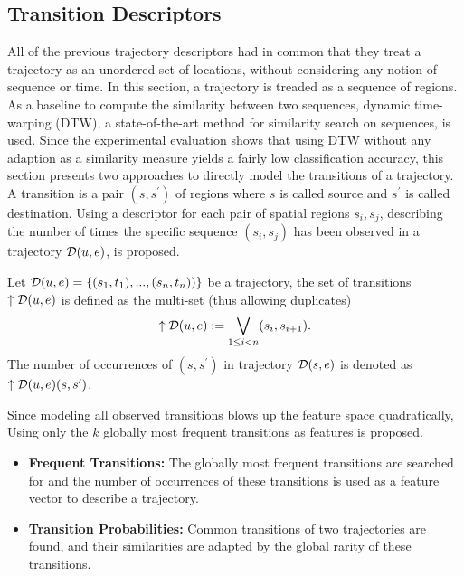 \subsection{Transition Descriptors}\label{subsubsec:trans}
All of the previous trajectory descriptors had in common that they treat a trajectory as an unordered set of locations, without considering any notion of sequence or time. In this section, a trajectory is treaded as a sequence of regions. As a baseline to compute the similarity between two sequences, dynamic time-warping \cite{Berndt1994} (DTW), a state-of-the-art method for similarity search on sequences, is used. Since the experimental evaluation shows that using DTW without any adaption as a similarity measure yields a fairly low classification accuracy, this section presents two approaches to directly model the transitions of a trajectory. A transition is a pair $(s,s^\prime)$ of regions where $s$ is called source and $s^\prime$ is called destination. Using a descriptor for each pair of spatial regions $s_i,s_j$, describing the number of times the specific sequence $(s_i,s_j)$ has been observed in a trajectory $\mathcal{D}(u,e)$, is proposed.

\begin{definition}
Let $\mathcal{D}(u,e)=\{(s_1,t_1),...,(s_n,t_n))\}$ be a trajectory, the set of transitions $\uparrow\mathcal{D}(u,e)$ is defined as the multi-set (thus allowing duplicates)
$$
\uparrow\mathcal{D}(u,e):=\bigvee_{1\leq i< n}(s_i,s_{i+1}).
$$
The number of occurrences of $(s,s^\prime)$ in trajectory $\mathcal{D}(s,e)$ is denoted as $\uparrow\mathcal{D}(u,e)(s,s^\prime)$.
\end{definition}
Since modeling all observed transitions blows up the feature space quadratically, Using only the $k$ globally most frequent transitions as features is proposed.
\begin{itemize}
  \item {\bf Frequent Transitions:} The globally most frequent transitions are searched for and the number of occurrences of these transitions is used as a feature vector to describe a trajectory.
  \item {\bf Transition Probabilities:} Common transitions of two trajectories are found, and their similarities are adapted by the global rarity of these transitions.
\end{itemize}

